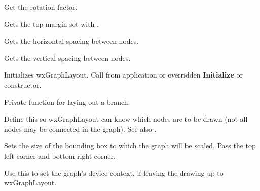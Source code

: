 

Get the rotation factor.



Gets the top margin set with .



Gets the horizontal spacing between nodes.



Gets the vertical spacing between nodes.



Initializes wxGraphLayout. Call from application or overridden {\bf Initialize}
or constructor.



Private function for laying out a branch.

\label{nodeactive}


Define this so wxGraphLayout can know which nodes are to be drawn (not all
nodes may be connected in the graph). See also .



Sets the size of the bounding box to which the graph will be scaled. Pass the
top left corner and bottom right corner.

\label{setdc}


Use this to set the graph's device context, if leaving the drawing up
to wxGraphLayout.


